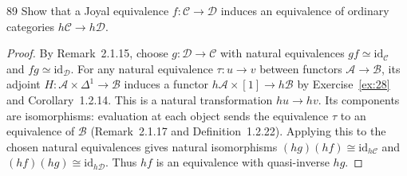 \begin{exercise}{89}
Show that a Joyal equivalence $f\colon\mathcal C\to\mathcal D$ induces an
equivalence of ordinary categories $h\mathcal C\to h\mathcal D$.

\begin{proof}
By Remark~2.1.15, choose $g\colon\mathcal D\to\mathcal C$ with natural
equivalences $gf\simeq\mathrm{id}_{\mathcal C}$ and
$fg\simeq\mathrm{id}_{\mathcal D}$.
For any natural equivalence $\tau\colon u\to v$ between functors
$\mathcal A\to\mathcal B$, its adjoint
$H\colon\mathcal A\times\Delta^1\to\mathcal B$ induces a functor
$h\mathcal A\times[1]\to h\mathcal B$ by Exercise~\ref{ex:28}
and Corollary~1.2.14.
This is a natural transformation $hu\to hv$.
Its components are isomorphisms: evaluation at each object sends
the equivalence $\tau$ to an equivalence of $\mathcal B$
(Remark~2.1.17 and Definition~1.2.22).
Applying this to the chosen natural equivalences gives natural isomorphisms
$(hg)(hf)\cong\mathrm{id}_{h\mathcal C}$ and
$(hf)(hg)\cong\mathrm{id}_{h\mathcal D}$.
Thus $hf$ is an equivalence with quasi-inverse $hg$.
\end{proof}
\end{exercise}
